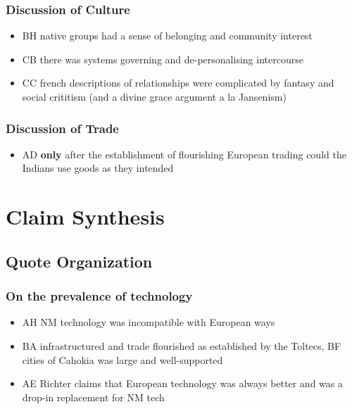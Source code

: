 \documentclass[letterpaper]{article}
\begin{document}
\subsubsection{Discussion of Culture}
\label{sec:orgdc3c82b}
\begin{itemize}
\item BH native groups had a sense of belonging and community interest
\item CB there was systems governing and de-personalising intercourse
\item CC french descriptions of relationships were complicated by fantasy and social crititism (and a divine grace argument a la Jansenism)
\end{itemize}

\subsubsection{Discussion of Trade}
\label{sec:orgb253acc}
\begin{itemize}
\item AD \textbf{only} after the establishment of flourishing European trading could the Indians use goods as they intended
\end{itemize}

\section{Claim Synthesis}
\label{sec:org98ed93e}

\subsection{Quote Organization}
\label{sec:org3231b18}

\subsubsection{On the prevalence of technology}
\label{sec:orgd5b9d19}
\begin{itemize}
\item AH NM technology was incompatible with European ways
\item BA infrastructured and trade flourished as established by the Toltecs, BF cities of Cahokia was large and well-supported
\item AE Richter claims that European technology was always better and was a drop-in replacement for NM tech
\end{itemize}
\end{document}
